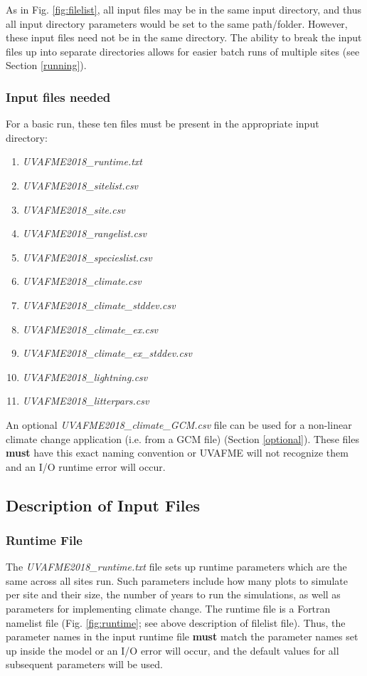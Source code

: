 \documentclass[a4paper, 12pt] {article}
\begin{document}
As in Fig. \ref{fig:filelist}, all input files may be in the same input directory, and thus all input directory parameters would be set to the same path/folder. However, these input files need not be in the same directory. The ability to break the input files up into separate directories allows for easier batch runs of multiple sites (see Section \ref{running}).

\subsubsection{Input files needed}
For a basic run, these ten files must be present in the appropriate input directory:

\begin{enumerate}
\item \textit{UVAFME2018\_runtime.txt}
\item \textit{UVAFME2018\_sitelist.csv}
\item \textit{UVAFME2018\_site.csv}
\item \textit{UVAFME2018\_rangelist.csv}
\item \textit{UVAFME2018\_specieslist.csv}
\item \textit{UVAFME2018\_climate.csv}
\item \textit{UVAFME2018\_climate\_stddev.csv}
\item \textit{UVAFME2018\_climate\_ex.csv}
\item \textit{UVAFME2018\_climate\_ex\_stddev.csv}
\item \textit{UVAFME2018\_lightning.csv}
\item \textit{UVAFME2018\_litterpars.csv}
\end{enumerate}

An optional \textit{UVAFME2018\_climate\_GCM.csv} file can be used for a non-linear climate change application (i.e. from a GCM file) (Section \ref{optional}). These files \textbf{must} have this exact naming convention or UVAFME will not recognize them and an I/O runtime error will occur.

\subsection{Description of Input Files}

\subsubsection{Runtime File}
The \textit{UVAFME2018\_runtime.txt} file sets up runtime parameters which are the same across all sites run. Such parameters include how many plots to simulate per site and their size, the number of years to run the simulations, as well as parameters for implementing climate change. The runtime file is a Fortran namelist file (Fig. \ref{fig:runtime}; see above description of filelist file). Thus, the parameter names in the input runtime file \textbf{must} match the parameter names set up inside the model or an I/O error will occur, and the default values for all subsequent parameters will be used. 
\end{document}
